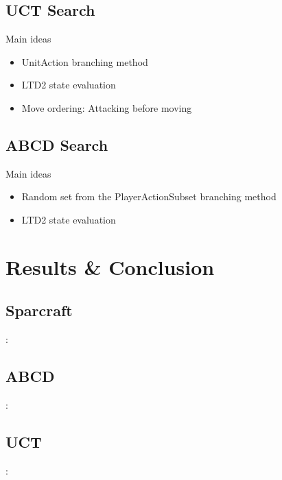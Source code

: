 \documentclass{beamer}
\newenvironment{framesubsec}{
    \begin{frame}{\subsecname}
}{\end{frame}}
\begin{document}
\subsection{UCT Search}
\begin{framesubsec}
    \begin{block}{Main ideas}
        \begin{itemize}
            \item UnitAction branching method 
            \item LTD2 state evaluation
            \item Move ordering: Attacking before moving 
        \end{itemize}
    \end{block}
\end{framesubsec}

\subsection{ABCD Search}
\begin{framesubsec}
    \begin{block}{Main ideas}
        \begin{itemize}
            \item Random set from the PlayerActionSubset branching method 
            \item LTD2 state evaluation
        \end{itemize}
    \end{block}
\end{framesubsec}

\section{Results \& Conclusion}

\subsection{Sparcraft}
\begin{frame}{\secname: \subsecname}
    \begin{center}
\end{center}
\end{frame}

\subsection{ABCD}
\begin{frame}{\secname: \subsecname}
    \begin{center}
\end{center}
\end{frame}

\subsection{UCT}
\begin{frame}{\secname: \subsecname}
    \begin{center}
\end{center}
\end{frame}
\end{document}
